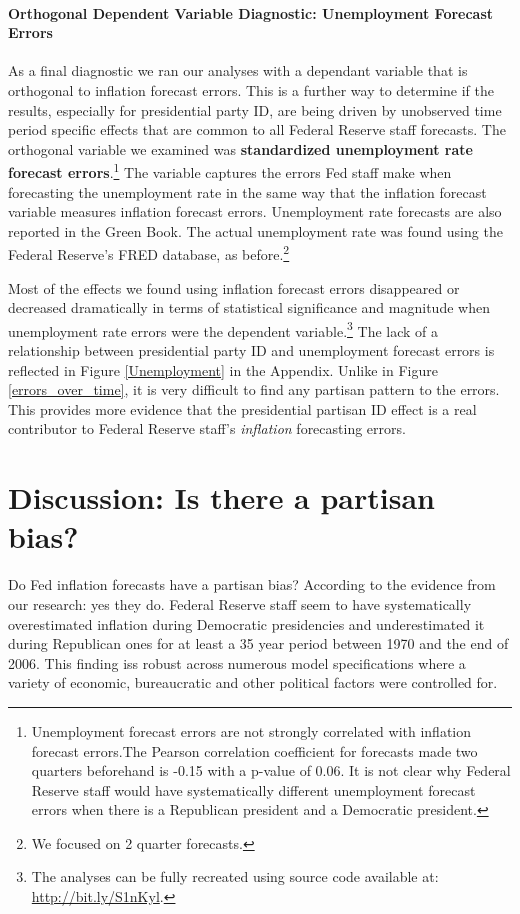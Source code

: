 \documentclass[a4paper]{article}\usepackage{graphicx, color}
\begin{document}
\paragraph{Orthogonal Dependent Variable Diagnostic: Unemployment Forecast Errors}

As a final diagnostic we ran our analyses with a dependant variable that is orthogonal to inflation forecast errors. This is a further way to determine if the results, especially for presidential party ID, are being driven by unobserved time period specific effects that are common to all Federal Reserve staff forecasts. The orthogonal variable we examined was {\bf{standardized unemployment rate forecast errors}}.\footnote{Unemployment forecast errors are not strongly correlated with inflation forecast errors.The Pearson correlation coefficient for forecasts made two quarters beforehand is -0.15 with a p-value of 0.06. It is not clear why Federal Reserve staff would have systematically different unemployment forecast errors when there is a Republican president and a Democratic president.} The variable captures the errors Fed staff make when forecasting the unemployment rate in the same way that the inflation forecast variable measures inflation forecast errors. Unemployment rate forecasts are also reported in the Green Book. The actual unemployment rate was found using the Federal Reserve's FRED database, as before.\footnote{We focused on 2 quarter forecasts.}

Most of the effects we found using inflation forecast errors disappeared or decreased dramatically in terms of statistical significance and magnitude when unemployment rate errors were the dependent variable.\footnote{The analyses can be fully recreated using source code available at: \url{http://bit.ly/S1nKyl}.} The lack of a relationship between presidential party ID and unemployment forecast errors is reflected in Figure \ref{Unemployment} in the Appendix. Unlike in Figure \ref{errors_over_time}, it is very difficult to find any partisan pattern to the errors. This provides more evidence that the presidential partisan ID effect is a real contributor to Federal Reserve staff's \emph{inflation} forecasting errors.

\section*{Discussion: Is there a partisan bias?}

Do Fed inflation forecasts have a partisan bias? According to the evidence from our research: yes they do. Federal Reserve staff seem to have systematically overestimated inflation during Democratic presidencies and underestimated it during Republican ones for at least a 35 year period between 1970 and the end of 2006. This finding iss robust across numerous model specifications where a variety of economic, bureaucratic and other political factors were controlled for. 
\end{document}
